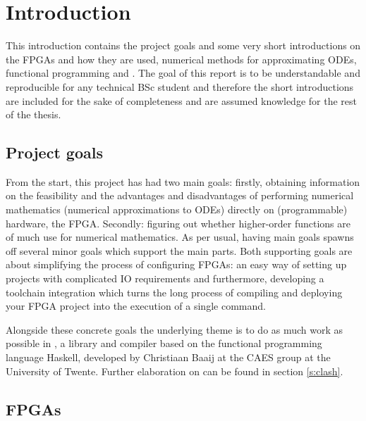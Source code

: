 \chapter{Introduction} 
This introduction contains the project goals and some very short introductions on the FPGAs and how they are used, numerical methods for approximating ODEs, functional programming and \clash{}. The goal of this report is to be understandable and reproducible for any technical BSc student and therefore the short introductions are included for the sake of completeness and are assumed knowledge for the rest of the thesis. 

\section{Project goals}
From the start, this project has had two main goals: firstly, obtaining information on the feasibility and the advantages and disadvantages of performing numerical mathematics (numerical approximations to ODEs) directly on (programmable) hardware, the FPGA. Secondly: figuring out whether higher-order functions are of much use for numerical mathematics. As per usual, having main goals spawns off several minor goals which support the main parts. Both supporting goals are about simplifying the process of configuring FPGAs: an easy way of setting up projects with complicated IO requirements and furthermore, developing a toolchain integration which turns the long process of compiling and deploying your FPGA project into the execution of a single command.

Alongside these concrete goals the underlying theme is to do as much work as possible in \clash{}, a library and compiler based on the functional programming language Haskell, developed by Christiaan Baaij at the CAES group at the University of Twente. Further elaboration on \clash{} can be found in section \ref{s:clash}.


\section{FPGAs}
